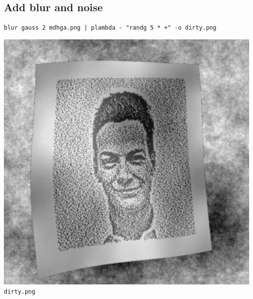 \subsection{Add blur and noise}
\begin{verbatim}
blur gauss 2 mdhga.png | plambda - "randg 5 * +" -o dirty.png
\end{verbatim}
\includegraphics{dirty.png}\verb+dirty.png+

